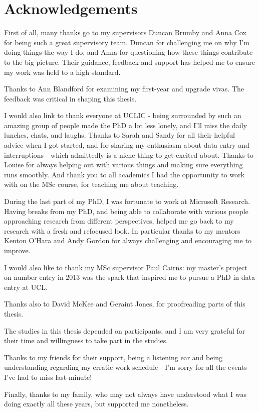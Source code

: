 \section*{Acknowledgements}

First of all, many thanks go to my supervisors Duncan Brumby and Anna Cox for being such a great supervisory team. Duncan for challenging me on why I'm doing things the way I do, and Anna for questioning how these things contribute to the big picture. Their guidance, feedback and support has helped me to ensure my work was held to a high standard.


Thanks to Ann Blandford for examining my first-year and upgrade vivas. The feedback was critical in shaping this thesis.

I would also link to thank everyone at UCLIC - being surrounded by such an amazing group of people made the PhD a lot less lonely, and I'll miss the daily lunches, chats, and laughs. Thanks to Sarah and Sandy for all their helpful advice when I got started, and for sharing my enthusiasm about data entry and interruptions - which admittedly is a niche thing to get excited about.
Thanks to Louise for always helping out with various things and making sure everything runs smoothly.
And thank you to all academics I had the opportunity to work with on the MSc course, for teaching me about teaching.

During the last part of my PhD, I was fortunate to work at Microsoft Research. Having breaks from my PhD, and being able to collaborate with  various people approaching research from different perspectives, helped me go back to my research with a fresh and refocused look. In particular thanks to my mentors Kenton O'Hara and Andy Gordon for always challenging and encouraging me to improve. 

I would also like to thank my MSc supervisor Paul Cairns: my master's project on number entry in 2013 was the spark that inspired me to pursue a PhD in data entry at UCL. 

Thanks also to David McKee and Geraint Jones, for proofreading parts of this thesis. 

The studies in this thesis depended on participants, and I am very grateful for their time and willingness to take part in the studies.

Thanks to my friends for their support, being a listening ear and being understanding regarding my erratic work schedule - I’m sorry for all the events I've had to miss last-minute!

Finally, thanks to my family, who may not always have understood what I was doing exactly all these years, but supported me nonetheless.